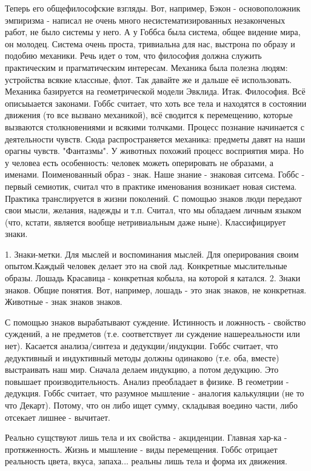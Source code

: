 Теперь его общефилософские взгляды.
Вот, например, Бэкон - основоположник эмпиризма - написал не очень много несистематизированных незаконченых работ, не было системы у него. А у Гоббса была система, общее видение мира, он молодец. Система очень проста, тривиальна для нас, выстрона по образу и подобию механики. Речь идет о том, что философия должна служить практическим и прагматическим интересам. Механика была полезна людям: устройства всякие классные, флот. Так давайте же и дальше её использовать. Механика базируется на геометрической модели Эвклида. Итак. Философия. Всё описыыается законами. Гоббс считает, что хоть все тела и находятся в состоянии движения (то все вызвано механикой), всё сводится к перемещению, которые вызваются столкновениями и всякими толчками. Процесс познание начинается с деятельности чувств. Сюда распространяется механика: предметы давят на наши орагны чувств. "Фантазмы". У животных похожий процесс восприятия мира. Но у человеа есть особенность: человек можеть оперировать не образами, а именами. Поименованный образ - знак. Наше знание - знаковая ситсема. Гоббс - первый семиотик, считал что в практике именования возникает новая система. Практика транслируется в жизни поколений. С помощью знаков люди передают свои мысли, желания, надежды и т.п. Считал, что мы обладаем личным языком (что, кстати, является вообще нетривиальным даже ныне). Классифицирует знаки.

	1. Знаки-метки. Для мыслей и воспоминания мыслей. Для оперирования своим опытом.Каждый человек делает это на свой лад. Конкретные мыслительные образы. Лошадь Красавица - конкретная кобыла, на которой я катался.
	2. Знаки знаков. Общие понятия. Вот, например, лошадь - это знак знаков, не конкретная. Животные - знак знаков знаков.

С помощью знаков вырабатывают суждение. Истинность и ложнность - свойство суждений, а не предметов (т.е. соответствует ли суждение нашереальности или нет).
Касается анализа/синтеза и дедукции/индукции. Гоббс считает, что дедуктивный и индуктивный методы должны одинаково (т.е. оба, вместе) выстраивать наш мир. Сначала делаем индукцию, а потом дедукцию. Это повышает производительность. Анализ преобладает в физике. В геометрии - дедукция. Гоббс считает, что разумное мышление - аналогия калькуляции (не то что Декарт). Потому, что он либо ищет сумму, складывая воедино части, либо отсекает лишнее - вычитает.

Реально сущствуют лишь тела и их свойства - акциденции. Главная хар-ка - протяженность. Жизнь и мышление - виды перемещения. Гоббс отрицает реальность цвета, вкуса, запаха... реальны лишь тела и форма их движения.

